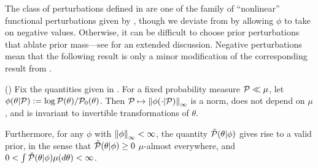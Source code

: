 The class of perturbations defined in  are one of the
family of ``nonlinear'' functional perturbations given by
\citet{gustafson:1996:local}, though we deviate from
\citet{gustafson:1996:local} by allowing $\phi$ to take on negative values.
Otherwise, it can be difficult to choose prior perturbations that ablate prior
mass---see  for an extended discussion.  Negative
perturbations mean that the following result is only a minor modification
of the corresponding result from \citet{gustafson:1996:local}.

\begin{lem}
%
(\citet{gustafson:1996:local})
%
Fix the quantities given in .  For a fixed probability
measure $\mathcal{P} \ll \mu$, let $\phi(\theta \vert \mathcal{P}) := \log \mathcal{P}(\theta) /
\mathcal{P}_{0}(\theta)$.  Then $\mathcal{P} \mapsto \left\Vert\phi(\cdot \vert \mathcal{P})\right\Vert_{\infty}$ is a
norm, does not depend on $\mu$, and is invariant to invertible transformations
of $\theta$.

Furthermore, for any $\phi$ with $\left\Vert\phi\right\Vert_{\infty} < \infty$, the quantity
$\tilde{\mathcal{P}}(\theta \vert \phi)$ gives rise to a valid prior, in the sense that
$\tilde{\mathcal{P}}(\theta \vert \phi) \ge 0$ $\mu$-almost everywhere, and
$0 < \int \tilde{\mathcal{P}}(\theta \vert \phi) \mu(d\theta) < \infty$.
%
%
\end{lem}
